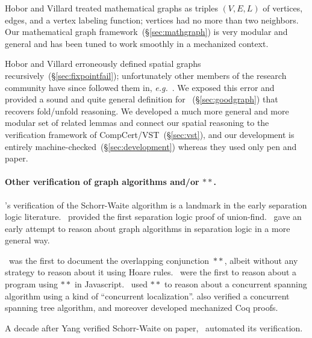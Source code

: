 \iftrue
Hobor and Villard treated mathematical graphs as triples $(V,E,L)$ of
vertices, edges, and a vertex labeling function; vertices had no more than two
neighbors.  Our mathematical graph framework~(\S\ref{sec:mathgraph}) is very
modular and general and has been tuned to work smoothly in a mechanized context.

Hobor and Villard erroneously defined spatial graphs
recursively~(\S\ref{sec:fixpointfail}); unfortunately other members of the research
community have since followed them in, \emph{e.g.}~\cite{raadvg15}.  We exposed this
error and provided a sound and quite general definition for
~(\S\ref{sec:goodgraph}) that recovers fold/unfold reasoning.  We developed a
much more general and more modular set of related lemmas and connect our spatial
reasoning to the verification framework of CompCert/VST~(\S\ref{sec:vst}), and
our development is entirely
machine-checked~(\S\ref{sec:development}) whereas they used only pen and paper.

\fi

\paragraph{Other verification of graph algorithms and/or $**$.}
\cite{hongseok:phd}'s verification of the Schorr-Waite algorithm is a landmark in the
early separation logic literature.  \cite{neelthesis}~provided the first separation
logic proof of union-find.  \cite{bornat:aliasing04}~gave an early attempt to
reason about graph algorithms in separation logic in a more general
way.

\cite{rey-slnotes}~was the first to document the overlapping conjunction~$**$, albeit without
any strategy to reason about it using Hoare rules.
\cite{gardnerms12}~were the first to reason about a program using $**$ in
Javascript.  \cite{raadvg15}~used $**$ to reason about a
concurrent spanning algorithm using a kind of
``concurrent localization''.  \cite{ilya-graphs} also verified a
concurrent spanning tree algorithm, and moreover developed mechanized Coq proofs.

A decade after Yang verified Schorr-Waite on paper, \cite{leino10}~automated
its verification.


